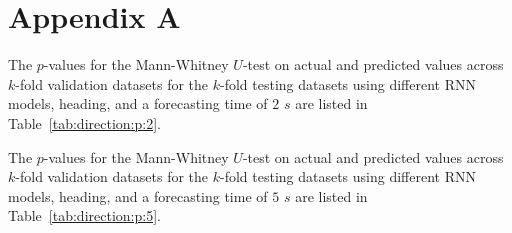 \appendix
\section{Appendix A}
\label{appA}

The $p$-values for the Mann-Whitney $U$-test on actual and predicted values across $k$-fold validation datasets for the $k$-fold testing datasets using different RNN models, heading, and a forecasting time of $2$ $s$ are listed in Table~\ref{tab:direction:p:2}.

\begin{table}[!ht]
	\centering
	\caption{The $p$-values for the Mann-Whitney $U$-test on actual and predicted values across $k$-fold validation datasets for the $k$-fold testing datasets using different RNN models, heading, and a forecasting time of $2$ $s$.}
	\label{tab:direction:p:2}
\end{table}

The $p$-values for the Mann-Whitney $U$-test on actual and predicted values across $k$-fold validation datasets for the $k$-fold testing datasets using different RNN models, heading, and a forecasting time of $5$ $s$ are listed in Table~\ref{tab:direction:p:5}.

